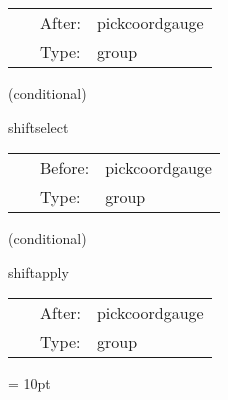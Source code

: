 \documentclass{article}
\begin{document}
\hspace{5mm}{\it lapse application group } 


\hspace{5mm}

 \begin{tabular*}{160mm}{cll} 
~ & After:  & pickcoordgauge \\ 
~ & Type:  & group \\ 
\end{tabular*} 


\vspace{5mm}

   (conditional) 

\hspace{5mm} shiftselect 

\hspace{5mm}{\it shift selection group } 


\hspace{5mm}

 \begin{tabular*}{160mm}{cll} 
~ & Before:  & pickcoordgauge \\ 
~ & Type:  & group \\ 
\end{tabular*} 


\vspace{5mm}

   (conditional) 

\hspace{5mm} shiftapply 

\hspace{5mm}{\it shift application group } 


\hspace{5mm}

 \begin{tabular*}{160mm}{cll} 
~ & After:  & pickcoordgauge \\ 
~ & Type:  & group \\ 
\end{tabular*} 



\vspace{5mm}\parskip = 10pt 
\end{document}
